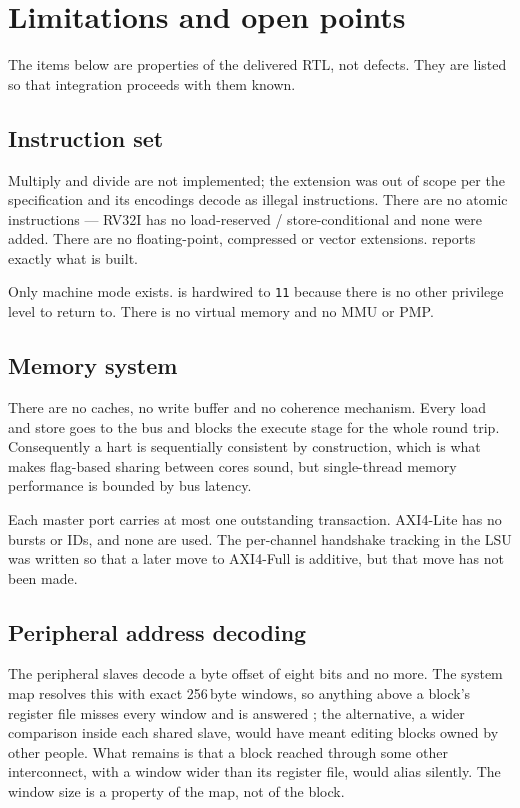 \chapter{Limitations and open points}
\label{ch:limits}

The items below are properties of the delivered RTL, not defects. They are listed
so that integration proceeds with them known.

\section{Instruction set}

Multiply and divide are not implemented; the  extension was out of scope
per the specification and its encodings decode as illegal instructions. There are
no atomic instructions --- RV32I has no load-reserved / store-conditional and none
were added. There are no floating-point, compressed or vector extensions.
 reports exactly what is built.

Only machine mode exists.  is hardwired to \texttt{11} because
there is no other privilege level to return to. There is no virtual memory and no
MMU or PMP.

\section{Memory system}

There are no caches, no write buffer and no coherence mechanism. Every load and
store goes to the bus and blocks the execute stage for the whole round trip.
Consequently a hart is sequentially consistent by construction, which is what
makes flag-based sharing between cores sound, but single-thread memory
performance is bounded by bus latency.

Each master port carries at most one outstanding transaction. AXI4-Lite has no
bursts or IDs, and none are used. The per-channel handshake tracking in the LSU
was written so that a later move to AXI4-Full is additive, but that move has not
been made.

\section{Peripheral address decoding}

The peripheral slaves decode a byte offset of eight bits and no more. The system
map resolves this with exact 256\,byte windows, so anything above a block's
register file misses every window and is answered ; the alternative,
a wider comparison inside each shared slave, would have meant editing blocks
owned by other people. What remains is that a block reached through some other
interconnect, with a window wider than its register file, would alias silently.
The window size is a property of the map, not of the block.

